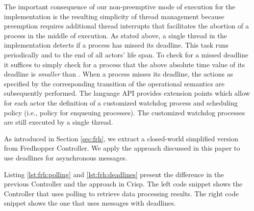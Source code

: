 The important consequence of our non-preemptive mode of execution 
for the implementation is the resulting simplicity of thread management
because preemption requires additional thread interrupts that facilitates the abortion of a process in the middle of execution.
% 
As stated above,  a single  thread in the implementation detects if a process has missed its deadline.
This task  runs periodically and to the end of all actors' life span.
To check for a missed deadline it suffices to simply check  for a process 
that the  above absolute time value of its deadline is \emph{smaller} than
.
When a process misses its deadline,  the actions as specified by the corresponding transition of the operational semantics are subsequently performed.
% 
The language API provides  extension points which allow for each actor
the definition of a customized watchdog process and scheduling policy
(i.e., policy for enqueuing processes).
The customized  watchdog processes are still  executed by a single thread.


As introduced in Section \ref{sec:frh}, we extract a closed-world simplified version from Fredhopper Controller.
We apply the approach discussed in this paper to use deadlines for asynchronous messages.

Listing \ref{lst:frh:polling} and \ref{lst:frh:deadlines} present the difference in the previous Controller and the approach in Crisp.
The left code snippet shows the Controller that uses polling to retrieve data processing results.
The right code snippet shows the one that uses messages with deadlines.

